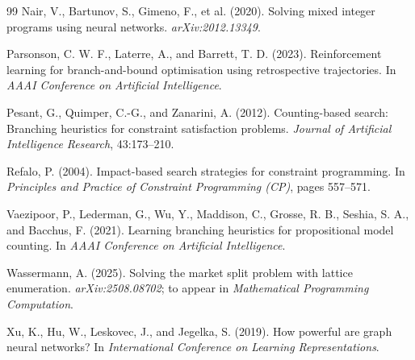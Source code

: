 \documentclass[final,5p,times,twocolumn]{elsarticle}
\begin{document}
\begin{thebibliography}{99}
Nair, V., Bartunov, S., Gimeno, F., et al. (2020).
Solving mixed integer programs using neural networks.
\emph{arXiv:2012.13349}.

Parsonson, C. W. F., Laterre, A., and Barrett, T. D. (2023).
Reinforcement learning for branch-and-bound optimisation using retrospective trajectories.
In \emph{AAAI Conference on Artificial Intelligence}.

Pesant, G., Quimper, C.-G., and Zanarini, A. (2012).
Counting-based search: Branching heuristics for constraint satisfaction problems.
\emph{Journal of Artificial Intelligence Research}, 43:173--210.

Refalo, P. (2004).
Impact-based search strategies for constraint programming.
In \emph{Principles and Practice of Constraint Programming (CP)}, pages 557--571.

Vaezipoor, P., Lederman, G., Wu, Y., Maddison, C., Grosse, R. B., Seshia, S. A., and Bacchus, F. (2021).
Learning branching heuristics for propositional model counting.
In \emph{AAAI Conference on Artificial Intelligence}.

Wassermann, A. (2025).
Solving the market split problem with lattice enumeration.
\emph{arXiv:2508.08702}; to appear in \emph{Mathematical Programming Computation}.

Xu, K., Hu, W., Leskovec, J., and Jegelka, S. (2019).
How powerful are graph neural networks?
In \emph{International Conference on Learning Representations}.

\end{thebibliography}
\end{document}
